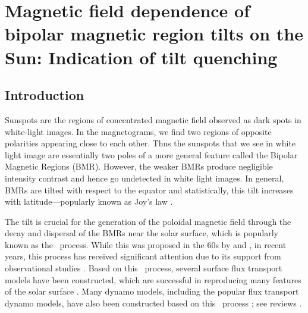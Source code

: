 \chapter[An Indication of BMRs Tilt Quenching in the Sun]{Magnetic field dependence of bipolar magnetic region tilts on the Sun: Indication of tilt quenching}
\label{Chap6}
\noindent


\section{Introduction}
\label{ch6:intro}
Sunspots are the regions of concentrated magnetic field observed as dark spots in white-light images. In the magnetograms, we find two regions of opposite
polarities appearing close to each other. Thus the sunspots that we see in white light image are essentially two poles of a more general feature called the Bipolar Magnetic Regions (BMR). However, the weaker BMRs produce negligible intensity contrast and hence go undetected in white light images.
In general, BMRs are tilted with respect to the equator and statistically, this tilt increases with latitude---popularly known as Joy's law \citep{Hale1908}. 


The tilt is crucial for the generation of the poloidal magnetic field through the decay and dispersal of the BMRs near the solar surface, 
which is popularly known as the \bl\ process. While this was proposed in the 60s by \citet{Babcock1961} and \citet{Leighton1964}, in recent years, this process has received significant attention due to its support from observational studies \citep{DasiEspuig2010, Kitchatinov2010, MunozJaramillo2013, Priyal2014}. 
 Based on this \bl\ process, several surface flux transport models have been constructed, 
which are successful in reproducing many features of the solar surface \citep{Jiang2014a}.
Many dynamo models, including the popular flux transport dynamo models, 
have also been constructed based on this \bl\ process \citep{Leighton1969, Wang1991a, Wang1991}; see reviews \citep{Charbonneau2010, Karak2014, Choudhuri2018}. 


